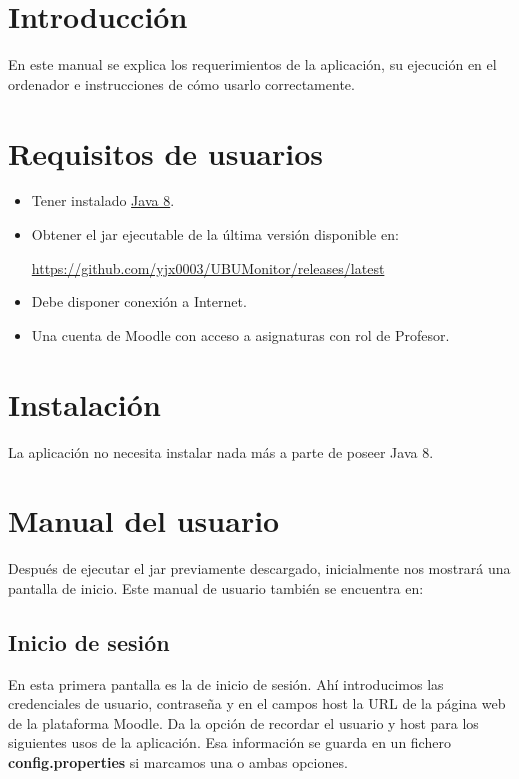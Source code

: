 
\section{Introducción}

En este manual se explica los requerimientos de la aplicación, su ejecución en el ordenador e instrucciones de cómo usarlo correctamente.


\section{Requisitos de usuarios} \label{sec:requisitos_usuarios}

\begin{itemize}
	
	\item Tener instalado \href{https://www.java.com/es/download/}{Java 8}. 
	\item Obtener el jar ejecutable de la última versión disponible en:
	
	\href{https://github.com/yjx0003/UBUMonitor/releases/latest}{https://github.com/yjx0003/UBUMonitor/releases/latest}
	\item Debe disponer conexión a Internet.
	\item Una cuenta de Moodle con acceso a asignaturas con rol de Profesor.
\end{itemize}



\section{Instalación}

La aplicación no necesita instalar nada más a parte de poseer Java 8.

\section{Manual del usuario}

Después de ejecutar el jar previamente descargado, inicialmente nos mostrará una pantalla de inicio.
Este manual de usuario también se encuentra en:



\subsection{Inicio de sesión}

En esta primera pantalla es la de inicio de sesión. Ahí introducimos las credenciales de usuario, contraseña y en el campos host la URL de la página web de la plataforma Moodle.
Da la opción de recordar el usuario y host para los siguientes usos de la aplicación. Esa información se guarda en un fichero \textbf{config.properties} si marcamos una o ambas opciones.

